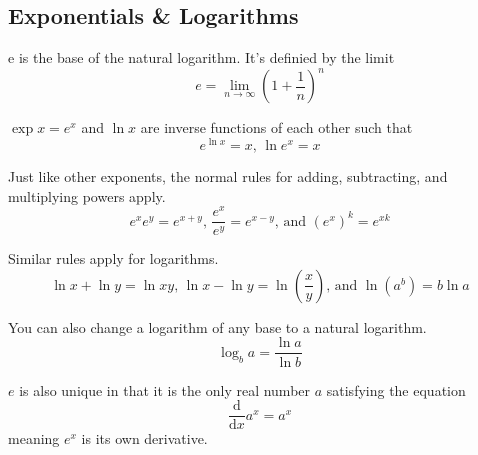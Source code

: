 \subsection{Exponentials \& Logarithms}
\begin{definition}
	e is the base of the natural logarithm. It's definied by the limit
	\begin{equation*}
		e = \lim\limits_{n\rightarrow\infty}{\left(1+\frac{1}{n}\right)^n}
	\end{equation*}
\end{definition}
$\exp{x} = e^x$ and $\ln{x}$ are inverse functions of each other such that
\begin{equation*}
	e^{\ln{x}} = x \text{, } \ln{e^x} = x
\end{equation*}

\noindent
Just like other exponents, the normal rules for adding, subtracting, and multiplying powers apply.
\begin{equation*}
	e^xe^y = e^{x+y}\text{, }\frac{e^x}{e^y}=e^{x-y}\text{, and }\left(e^x\right)^k=e^{xk}
\end{equation*}

\noindent
Similar rules apply for logarithms.
\begin{equation*}
	\ln{x}+\ln{y} = \ln{xy}\text{, }\ln{x}-\ln{y} = \ln{\left(\frac{x}{y}\right)}\text{, and }\ln{\left(a^b\right)}=b\ln{a}
\end{equation*}

\noindent
You can also change a logarithm of any base to a natural logarithm.
\begin{equation*}
	\log_{b}{a} = \frac{\ln{a}}{\ln{b}}
\end{equation*}

\noindent
$e$ is also unique in that it is the only real number $a$ satisfying the equation
\begin{equation*}
	\frac{\mathrm{d}}{\mathrm{d}x}a^x = a^x
\end{equation*}
meaning $e^x$ is its own derivative.